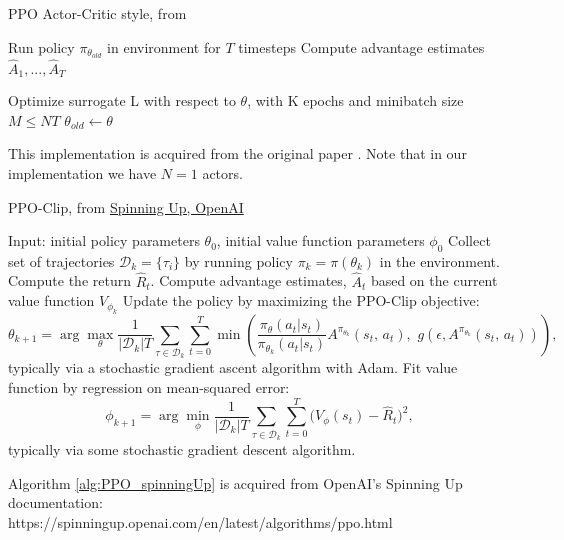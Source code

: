 \begin{algorithm}
\caption{PPO Actor-Critic style, from \cite{PPO}} \label{alg:PPO_actorCriticStyle}
\begin{algorithmic}[1]
        \State Run policy $\pi_{\theta_{old}}$ in environment for $T$ timesteps
        \State Compute advantage estimates $\hat{A}_1 ,..., \hat{A}_T$
    \EndFor
    
    \State Optimize surrogate L with respect to $\theta$, with K epochs and minibatch size $M \leq NT$
    \State $\theta_{old} \leftarrow \theta $
\EndFor
\end{algorithmic}
\end{algorithm}
\noindent
This implementation is acquired from the original paper \cite{PPO}. Note that in our implementation we have $N=1$ actors. \vspace{8mm}

\begin{algorithm}
\caption{PPO-Clip, from \href{https://spinningup.openai.com/en/latest/algorithms/ppo.html}{Spinning Up, OpenAI}} \label{alg:PPO_spinningUp}
\begin{algorithmic}[1]
\State Input: initial policy parameters $\theta_0$, initial value function parameters $\phi_0$
    \State Collect set of trajectories $\mathcal{D}_k = \{\tau_i\}$ by running policy $\pi_k = \pi(\theta_k)$ in the environment.
    \State Compute the return $\hat{R}_t$.
    \State Compute advantage estimates, $\hat{A}_t$ based on the current value function $V_{\phi_k}$
    \State Update the policy by maximizing the PPO-Clip objective:
    \[
    \theta_{k+1} = \arg \max_\theta \frac{1}{|\mathcal{D}_k|T} \sum_{\tau \in \mathcal{D}_k} \sum^{T}_{t=0} \min \left(
    \frac{\pi_\theta (a_t | s_t)}{\pi_{\theta_k} (a_t | s_t)} 
    A^{\pi_{\theta_k}}(s_t, \, a_t), \,\, g(\epsilon, A^{\pi_{\theta_k}}(s_t, \, a_t))
    \right),
    \]
    typically via a stochastic gradient ascent algorithm with Adam.
    \State Fit value function by regression on mean-squared error:
    \[
    \phi_{k+1} = \arg \min_\phi \frac{1}{|\mathcal{D}_k|T} \sum_{\tau \in \mathcal{D}_k} \sum^{T}_{t=0}
    \Big(
    V_\phi (s_t) - \hat{R}_t
    \Big)^2,
    \]
    typically via some stochastic gradient descent algorithm.
\EndFor
\end{algorithmic}
\end{algorithm}

\noindent
Algorithm \ref{alg:PPO_spinningUp} is acquired from OpenAI's Spinning Up documentation:\\
https://spinningup.openai.com/en/latest/algorithms/ppo.html 


